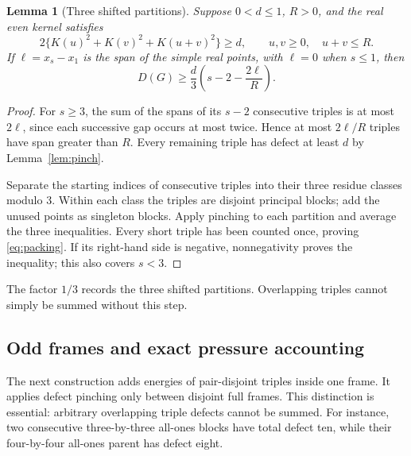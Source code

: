 \documentclass[11pt]{article}
\newtheorem{lemma}[theorem]{Lemma}
\theoremstyle{remark}
\begin{document}
\begin{lemma}[Three shifted partitions]\label{lem:triples}
Suppose $0<d\le1$, $R>0$, and the real even kernel satisfies
\begin{equation}\label{eq:triangle}
 2\{K(u)^2+K(v)^2+K(u+v)^2\}\ge d,
 \qquad u,v\ge0,\quad u+v\le R.
\end{equation}
If $\ell=x_s-x_1$ is the span of the simple real points, with $\ell=0$
when $s\le1$, then
\begin{equation}\label{eq:packing}
 D(G)\ge\frac d3\left(s-2-\frac{2\ell}{R}\right).
\end{equation}
\end{lemma}
\begin{proof}
For $s\ge3$, the sum of the spans of its $s-2$ consecutive triples is
at most $2\ell$, since each successive gap occurs at most twice. Hence
at most $2\ell/R$ triples have span greater than $R$. Every remaining
triple has defect at least $d$ by Lemma~\ref{lem:pinch}.

Separate the starting indices of consecutive triples into their three
residue classes modulo 3. Within each class the triples are disjoint
principal blocks; add the unused points as singleton blocks. Apply
pinching to each partition and average the three inequalities. Every
short triple has been counted once, proving \eqref{eq:packing}. If its
right-hand side is negative, nonnegativity proves the inequality; this
also covers $s<3$.
\end{proof}

The factor $1/3$ records the three shifted partitions. Overlapping triples
cannot simply be summed without this step.

\subsection{Odd frames and exact pressure accounting}

The next construction adds energies of pair-disjoint triples inside one
frame. It applies defect pinching only between disjoint full frames. This
distinction is essential: arbitrary overlapping triple defects cannot be
summed. For instance, two consecutive three-by-three all-ones blocks have
total defect ten, while their four-by-four all-ones parent has defect eight.
\end{document}
